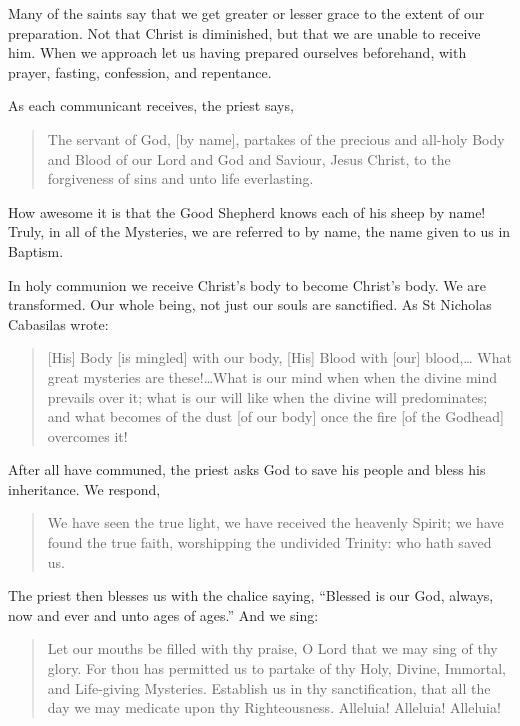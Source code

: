 \documentclass[
]{article}
\begin{document}
Many of the saints say that we get greater or lesser grace to the extent
of our preparation. Not that Christ is diminished, but that we are
unable to receive him. When we approach let us having prepared ourselves
beforehand, with prayer, fasting, confession, and repentance.

As each communicant receives, the priest says,

\begin{quote}
The servant of God, {[}by name{]}, partakes of the precious and all-holy
Body and Blood of our Lord and God and Saviour, Jesus Christ, to the
forgiveness of sins and unto life everlasting.
\end{quote}

How awesome it is that the Good Shepherd knows each of his sheep by
name! Truly, in all of the Mysteries, we are referred to by name, the
name given to us in Baptism.

In holy communion we receive Christ's body to become Christ's body. We
are transformed. Our whole being, not just our souls are sanctified. As
St Nicholas Cabasilas wrote:

\begin{quote}
{[}His{]} Body {[}is mingled{]} with our body, {[}His{]} Blood with
{[}our{]} blood,\ldots{} What great mysteries are these!\ldots What is
our mind when when the divine mind prevails over it; what is our will
like when the divine will predominates; and what becomes of the dust
{[}of our body{]} once the fire {[}of the Godhead{]} overcomes it!
\end{quote}

After all have communed, the priest asks God to save his people and
bless his inheritance. We respond,

\begin{quote}
We have seen the true light, we have received the heavenly Spirit; we
have found the true faith, worshipping the undivided Trinity: who hath
saved us.
\end{quote}

The priest then blesses us with the chalice saying, ``Blessed is our
God, always, now and ever and unto ages of ages.'' And we sing:

\begin{quote}
Let our mouths be filled with thy praise, O Lord that we may sing of thy
glory. For thou has permitted us to partake of thy Holy, Divine,
Immortal, and Life-giving Mysteries. Establish us in thy sanctification,
that all the day we may medicate upon thy Righteousness. Alleluia!
Alleluia! Alleluia!
\end{quote}
\end{document}
